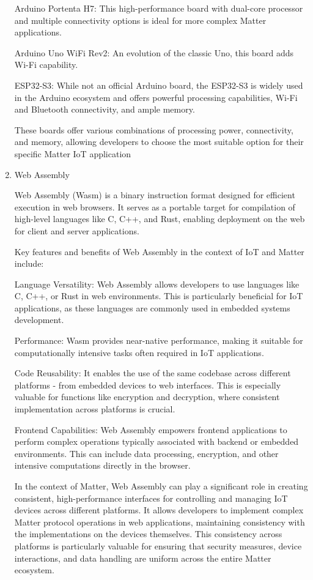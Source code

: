 \documentclass[conference]{IEEEtran}
\begin{document}
\begin{enumerate}[itemsep=2ex, parsep=1ex]
	      Arduino Portenta H7: This high-performance board with dual-core processor and multiple connectivity options is ideal for more complex Matter applications.
	          
	      Arduino Uno WiFi Rev2: An evolution of the classic Uno, this board adds Wi-Fi capability.
	      
	      ESP32-S3: While not an official Arduino board, the ESP32-S3 is widely used in the Arduino ecosystem and offers powerful processing capabilities, Wi-Fi and Bluetooth connectivity, and ample memory.
	          
	      These boards offer various combinations of processing power, connectivity, and memory, allowing developers to choose the most suitable option for their specific Matter IoT application
	          
	\item Web Assembly
	      
	      Web Assembly (Wasm) is a binary instruction format designed for efficient execution in web browsers. It serves as a portable target for compilation of high-level languages like C, C++, and Rust, enabling deployment on the web for client and server applications.
	      
	      Key features and benefits of Web Assembly in the context of IoT and Matter include:
	          
	      Language Versatility: Web Assembly allows developers to use languages like C, C++, or Rust in web environments. This is particularly beneficial for IoT applications, as these languages are commonly used in embedded systems development.
	          
	      Performance: Wasm provides near-native performance, making it suitable for computationally intensive tasks often required in IoT applications.
	          
	      Code Reusability: It enables the use of the same codebase across different platforms - from embedded devices to web interfaces. This is especially valuable for functions like encryption and decryption, where consistent implementation across platforms is crucial.
	          
	      Frontend Capabilities: Web Assembly empowers frontend applications to perform complex operations typically associated with backend or embedded environments. This can include data processing, encryption, and other intensive computations directly in the browser.
	          
	      In the context of Matter, Web Assembly can play a significant role in creating consistent, high-performance interfaces for controlling and managing IoT devices across different platforms. It allows developers to implement complex Matter protocol operations in web applications, maintaining consistency with the implementations on the devices themselves. This consistency across platforms is particularly valuable for ensuring that security measures, device interactions, and data handling are uniform across the entire Matter ecosystem.
	          
\end{enumerate}
\end{document}
